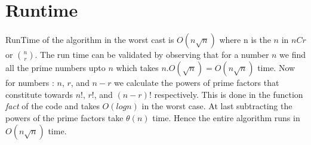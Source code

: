 \documentclass{article}
\begin{document}
\section{Runtime}

RunTime of the algorithm in the worst cast is $O(n\sqrt{n})$ where
n is the $n$ in $nCr$ or $\binom{n}{r}$. The run time can be validated
by observing that for a number $n$ we find all the prime numbers upto
$n$ which takes $n.O(\sqrt{n}) = O(n\sqrt{n})$ time. Now for numbers : 
$n$, $r$, and $n-r$ we calculate the powers of prime factors that
constitute towards $n!$, $r!$, and $(n-r)!$ respectively. This is
done in the function \emph{fact} of the code and takes $O(logn)$ in
the worst case. At last subtracting the powers of the prime factors
take $\theta(n)$ time. Hence the entire algorithm runs in 
$O(n\sqrt{n})$ time.
\end{document}
